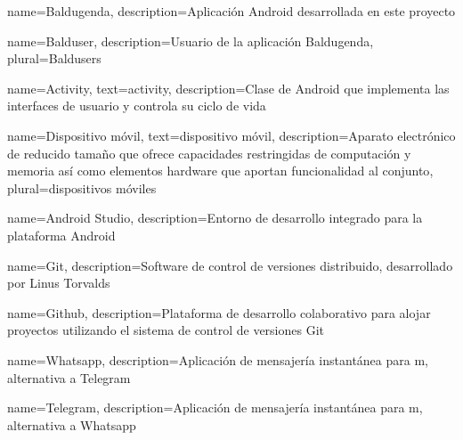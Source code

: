 {
    name=Baldugenda,
    description={Aplicaci\'on Android desarrollada en este proyecto} 
}

{
    name=Balduser,
    description={Usuario de la aplicaci\'on Baldugenda},
    plural={Baldusers}
}

{
    name=Activity,
    text={activity},
    description={Clase de Android que implementa las interfaces de usuario y controla su ciclo de vida}
}

{
    name=Dispositivo móvil,
    text={dispositivo móvil},
    description={Aparato electrónico de reducido tamaño que ofrece capacidades restringidas de computación y memoria así como elementos hardware que aportan funcionalidad al conjunto},
    plural={dispositivos móviles}
}

{
    name=Android Studio,
    description={Entorno de desarrollo integrado para la plataforma Android}
}

{
    name=Git,
    description={Software de control de versiones distribuido, desarrollado por Linus Torvalds}
}

{
    name=Github,
    description={Plataforma de desarrollo colaborativo para alojar proyectos utilizando el sistema de control de versiones \gls{Git}}
}

{
    name=Whatsapp,
    description={Aplicaci\'on de mensajería instant\'anea para m, alternativa a Telegram}
}

{
    name=Telegram,
    description={Aplicaci\'on de mensajería instant\'anea para m, alternativa a Whatsapp}
}










